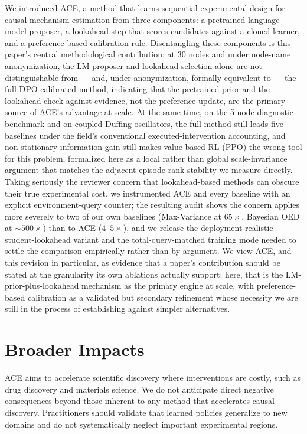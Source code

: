 \documentclass{article}
\theoremstyle{plain}
\theoremstyle{definition}
\theoremstyle{remark}
\begin{document}
We introduced ACE, a method that learns sequential experimental design for causal mechanism estimation from three components: a pretrained language-model proposer, a lookahead step that scores candidates against a cloned learner, and a preference-based calibration rule. Disentangling these components is this paper's central methodological contribution: at 30 nodes and under node-name anonymization, the LM proposer and lookahead selection alone are not distinguishable from --- and, under anonymization, formally equivalent to --- the full DPO-calibrated method, indicating that the pretrained prior and the lookahead check against evidence, not the preference update, are the primary source of ACE's advantage at scale. At the same time, on the 5-node diagnostic benchmark and on coupled Duffing oscillators, the full method still leads five baselines under the field's conventional executed-intervention accounting, and non-stationary information gain still makes value-based RL (PPO) the wrong tool for this problem, formalized here as a local rather than global scale-invariance argument that matches the adjacent-episode rank stability we measure directly. Taking seriously the reviewer concern that lookahead-based methods can obscure their true experimental cost, we instrumented ACE and every baseline with an explicit environment-query counter; the resulting audit shows the concern applies more severely to two of our own baselines (Max-Variance at $65\times$, Bayesian OED at $\sim$$500\times$) than to ACE ($4$--$5\times$), and we release the deployment-realistic student-lookahead variant and the total-query-matched training mode needed to settle the comparison empirically rather than by argument. We view ACE, and this revision in particular, as evidence that a paper's contribution should be stated at the granularity its own ablations actually support: here, that is the LM-prior-plus-lookahead mechanism as the primary engine at scale, with preference-based calibration as a validated but secondary refinement whose necessity we are still in the process of establishing against simpler alternatives.

\section*{Broader Impacts}

ACE aims to accelerate scientific discovery where interventions are costly, such as drug discovery and materials science. We do not anticipate direct negative consequences beyond those inherent to any method that accelerates causal discovery. Practitioners should validate that learned policies generalize to new domains and do not systematically neglect important experimental regions.
\end{document}
